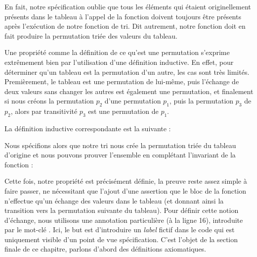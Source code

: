 


En fait, notre spécification oublie que tous les éléments qui étaient
originellement présents dans le tableau à l'appel de la fonction doivent
toujours être présents après l'exécution de notre fonction de tri. Dit
autrement, notre fonction doit en fait produire la permutation triée des
valeurs du tableau.



Une propriété comme la définition de ce qu'est une permutation s'exprime
extrêmement bien par l'utilisation d'une définition inductive. En effet, pour
déterminer qu'un tableau est la permutation d'un autre, les cas sont très limités.
Premièrement, le tableau est une permutation de lui-même, puis l'échange de
deux valeurs sans changer les autres est également une permutation, et
finalement si nous créons la permutation $p_2$ d'une permutation $p_1$, puis
la permutation $p_3$ de $p_2$, alors par transitivité $p_3$ est une permutation
de $p_1$.



La définition inductive correspondante est la suivante :






Nous spécifions alors que notre tri nous crée la permutation triée du tableau
d'origine et nous pouvons prouver l'ensemble en complétant l'invariant de la
fonction :





Cette fois, notre propriété est précisément définie, la preuve reste assez
simple à faire passer, ne nécessitant que l'ajout d'une assertion que le bloc
de la fonction n'effectue qu'un échange des valeurs dans le tableau (et donnant
ainsi la transition vers la permutation suivante du tableau). Pour définir cette
notion d'échange, nous utilisons une annotation particulière (à la ligne 16),
introduite par le mot-clé . Ici, le but est d'introduire un \textit{label}
fictif dans le code qui est uniquement visible d'un point de vue spécification.
C'est l'objet de la section finale de ce chapitre, parlons d'abord des définitions
axiomatiques.








